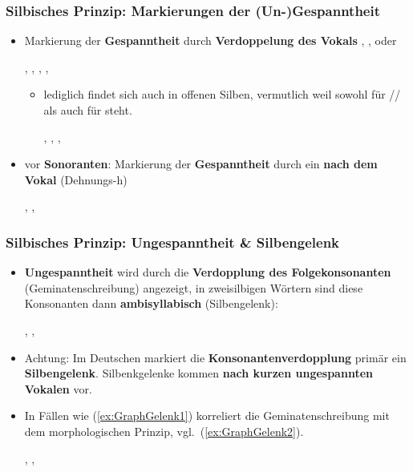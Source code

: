 \begin{frame}
\frametitle{Silbisches Prinzip: Markierungen der (Un-)Gespanntheit}

	\begin{itemize} 
		\item Markierung der \textbf{Gespanntheit} durch \textbf{Verdoppelung des Vokals} , ,  oder  
		
		\ea {}, , , , 
		\z

		\begin{itemize}
			\item lediglich  findet sich auch in offenen Silben, vermutlich weil  sowohl für /\textschwa{}/ als auch für  steht.
		
		\ea {}, , , %
		\z
		\end{itemize}
	
		\item vor \textbf{Sonoranten}: Markierung der \textbf{Gespanntheit} durch ein  \textbf{nach dem Vokal} (Dehnungs-h) 
		
		\ea {}, , 
		\z
	\end{itemize}

\end{frame}


\begin{frame}
\frametitle{Silbisches Prinzip: Ungespanntheit \& Silbengelenk}

\begin{itemize}
	\item \textbf{Ungespanntheit} wird \ua durch die \textbf{Verdopplung des Folgekonsonanten} (Geminatenschreibung) angezeigt, in zweisilbigen Wörtern sind diese Konsonanten dann \textbf{ambisyllabisch} (\dash Silbengelenk): 


\ea {}, , 
\z

	\item Achtung: Im Deutschen markiert die \textbf{Konsonantenverdopplung} primär ein \textbf{Silbengelenk}. Silbenkgelenke kommen \textbf{nach kurzen ungespannten Vokalen} vor.
	
	\item In Fällen wie (\ref{ex:GraphGelenk1}) korreliert die Geminatenschreibung mit dem morphologischen Prinzip, vgl.\ (\ref{ex:GraphGelenk2}).

	\ea 
	\ea\label{ex:GraphGelenk1} , 
	\ex\label{ex:GraphGelenk2} , 
	\z
	\z 
\end{itemize}
\end{frame}


